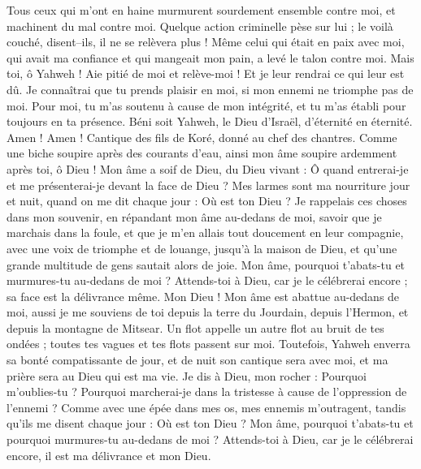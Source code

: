 \begin{multicols}{2}
Tous ceux qui m'ont en haine murmurent sourdement ensemble contre moi, et machinent du mal contre moi.
Quelque action criminelle pèse sur lui ; le voilà couché, disent–ils, il ne se relèvera plus !
Même celui qui était en paix avec moi, qui avait ma confiance et qui mangeait mon pain, a levé le talon contre moi.
Mais toi, ô Yahweh ! Aie pitié de moi et relève-moi ! Et je leur rendrai ce qui leur est dû.
Je connaîtrai que tu prends plaisir en moi, si mon ennemi ne triomphe pas de moi.
Pour moi, tu m'as soutenu à cause de mon intégrité, et tu m'as établi pour toujours en ta présence.
Béni soit Yahweh, le Dieu d'Israël, d'éternité en éternité. Amen ! Amen !
\VerseOne{}Cantique des fils de Koré, donné au chef des chantres.
Comme une biche soupire après des courants d'eau, ainsi mon âme soupire ardemment après toi, ô Dieu !
Mon âme a soif de Dieu, du Dieu vivant : Ô quand entrerai-je et me présenterai-je devant la face de Dieu ?
Mes larmes sont ma nourriture jour et nuit, quand on me dit chaque jour : Où est ton Dieu ?
Je rappelais ces choses dans mon souvenir, en répandant mon âme au-dedans de moi, savoir que je marchais dans la foule, et que je m'en allais tout doucement en leur compagnie, avec une voix de triomphe et de louange, jusqu'à la maison de Dieu, et qu'une grande multitude de gens sautait alors de joie.
Mon âme, pourquoi t'abats-tu et murmures-tu au-dedans de moi ? Attends-toi à Dieu, car je le célébrerai encore ; sa face est la délivrance même.
Mon Dieu ! Mon âme est abattue au-dedans de moi, aussi je me souviens de toi depuis la terre du Jourdain, depuis l'Hermon, et depuis la montagne de Mitsear.
Un flot appelle un autre flot au bruit de tes ondées ; toutes tes vagues et tes flots passent sur moi.
Toutefois, Yahweh enverra sa bonté compatissante de jour, et de nuit son cantique sera avec moi, et ma prière sera au Dieu qui est ma vie.
Je dis à Dieu, mon rocher : Pourquoi m'oublies-tu ? Pourquoi marcherai-je dans la tristesse à cause de l'oppression de l'ennemi ?
Comme avec une épée dans mes os, mes ennemis m'outragent, tandis qu'ils me disent chaque jour : Où est ton Dieu ?
Mon âme, pourquoi t'abats-tu et pourquoi murmures-tu au-dedans de moi ? Attends-toi à Dieu, car je le célébrerai encore, il est ma délivrance et mon Dieu.

\end{multicols}
